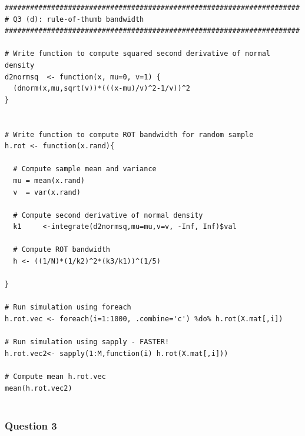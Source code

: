 \documentclass[12pt]{article}
\begin{document}
\begin{verbatim}
######################################################################
# Q3 (d): rule-of-thumb bandwidth
######################################################################

# Write function to compute squared second derivative of normal density
d2normsq  <- function(x, mu=0, v=1) {
  (dnorm(x,mu,sqrt(v))*(((x-mu)/v)^2-1/v))^2
}


# Write function to compute ROT bandwidth for random sample
h.rot <- function(x.rand){
  
  # Compute sample mean and variance
  mu = mean(x.rand)
  v  = var(x.rand)
  
  # Compute second derivative of normal density
  k1     <-integrate(d2normsq,mu=mu,v=v, -Inf, Inf)$val
  
  # Compute ROT bandwidth
  h <- ((1/N)*(1/k2)^2*(k3/k1))^(1/5)
  
}

# Run simulation using foreach
h.rot.vec <- foreach(i=1:1000, .combine='c') %do% h.rot(X.mat[,i])

# Run simulation using sapply - FASTER!
h.rot.vec2<- sapply(1:M,function(i) h.rot(X.mat[,i]))

# Compute mean h.rot.vec
mean(h.rot.vec2)


\end{verbatim}

\subsubsection{Question 3}
\end{document}
